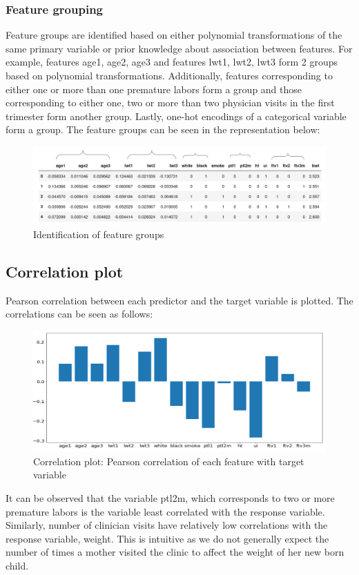 \documentclass[a4paper,12pt]{article}
\begin{document}
    \subsubsection{Feature grouping}
        Feature groups are identified based on either polynomial transformations of the same primary variable or prior knowledge about association between features. For example, features age1, age2, age3 and features lwt1, lwt2, lwt3 form 2 groups based on polynomial transformations. Additionally, features corresponding to either one or more than one premature labors form a group and those corresponding to either one, two or more than two physician visits in the first trimester form another group. Lastly, one-hot encodings of a categorical variable form a group. The feature groups can be seen in the representation below:
\begin{figure}[H]
\centering
\includegraphics[scale=0.25]{feature-grouping.png}
\caption{Identification of feature groups}
\label{fig:ALAMO Flowchart}
\end{figure}

        
        
\subsection{Correlation plot}
Pearson correlation between each predictor and the target variable is plotted. The correlations can be seen as follows:

    \begin{figure}[H]
     \centering
     \includegraphics[scale=0.25]{corr.png}
     \caption{Correlation plot: Pearson correlation of each feature with target variable}
      \label{fig:ALAMO Flowchart}
    \end{figure}
    \noindent It can be observed that the variable ptl2m, which corresponds to two or more premature labors is the variable least correlated with the response variable. Similarly, number of clinician visits have relatively low correlations with the response variable, weight. This is intuitive as we do not generally expect the number of times a mother visited the clinic to affect the weight of her new born child.
\end{document}
